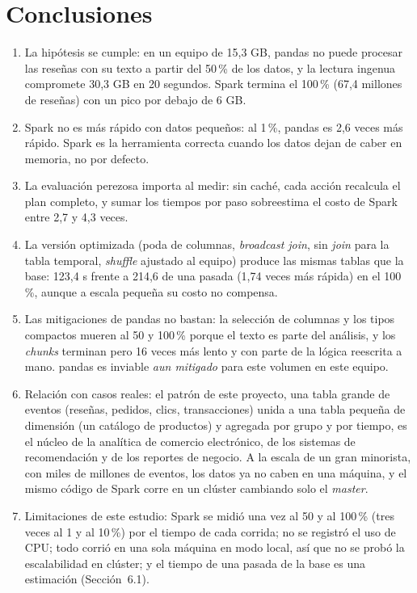 \documentclass[11pt,a4paper]{article}
\begin{document}
\section{Conclusiones}

\begin{enumerate}
  \item La hipótesis se cumple: en un equipo de 15,3 GB, pandas no puede procesar las reseñas
  con su texto a partir del 50\,\% de los datos, y la lectura ingenua compromete 30,3 GB en 20
  segundos. Spark termina el 100\,\% (67,4 millones de reseñas) con un pico por debajo de 6 GB.
  \item Spark no es más rápido con datos pequeños: al 1\,\%, pandas es 2,6 veces más rápido.
  Spark es la herramienta correcta cuando los datos dejan de caber en memoria, no por defecto.
  \item La evaluación perezosa importa al medir: sin caché, cada acción recalcula el plan
  completo, y sumar los tiempos por paso sobreestima el costo de Spark entre 2,7 y 4,3 veces.
  \item La versión optimizada (poda de columnas, \emph{broadcast join}, sin \emph{join} para
  la tabla temporal, \emph{shuffle} ajustado al equipo) produce las mismas tablas que la base:
  123,4 s frente a 214,6 de una pasada (1,74 veces más rápida) en el 100\,\%, aunque a escala
  pequeña su costo no compensa.
  \item Las mitigaciones de pandas no bastan: la selección de columnas y los tipos compactos
  mueren al 50 y 100\,\% porque el texto es parte del análisis, y los \textit{chunks} terminan
  pero 16 veces más lento y con parte de la lógica reescrita a mano. pandas es inviable
  \emph{aun mitigado} para este volumen en este equipo.
  \item Relación con casos reales: el patrón de este proyecto, una tabla grande de eventos
  (reseñas, pedidos, clics, transacciones) unida a una tabla pequeña de dimensión (un catálogo
  de productos) y agregada por grupo y por tiempo, es el núcleo de la analítica de comercio
  electrónico, de los sistemas de recomendación y de los reportes de negocio. A la escala de un
  gran minorista, con miles de millones de eventos, los datos ya no caben en una máquina, y el
  mismo código de Spark corre en un clúster cambiando solo el \emph{master}.
  \item Limitaciones de este estudio: Spark se midió una vez al 50 y al 100\,\% (tres veces al
  1 y al 10\,\%) por el tiempo de cada corrida; no se registró el uso de CPU; todo corrió en una
  sola máquina en modo local, así que no se probó la escalabilidad en clúster; y el tiempo de
  una pasada de la base es una estimación (Sección~6.1).
\end{enumerate}
\end{document}
